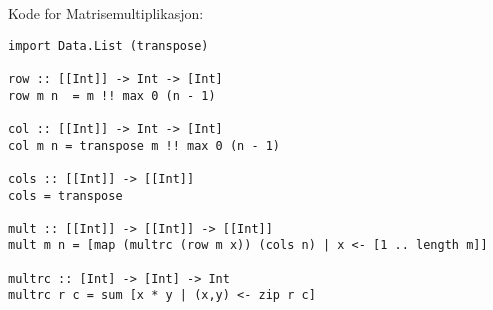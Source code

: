\documentclass{article}
\begin{document}
    \begin{ans}
        Kode for Matrisemultiplikasjon:
        \begin{lstlisting}
import Data.List (transpose)

row :: [[Int]] -> Int -> [Int]
row m n  = m !! max 0 (n - 1)

col :: [[Int]] -> Int -> [Int]
col m n = transpose m !! max 0 (n - 1)

cols :: [[Int]] -> [[Int]]
cols = transpose

mult :: [[Int]] -> [[Int]] -> [[Int]]
mult m n = [map (multrc (row m x)) (cols n) | x <- [1 .. length m]]

multrc :: [Int] -> [Int] -> Int
multrc r c = sum [x * y | (x,y) <- zip r c]
        \end{lstlisting}
    \end{ans}
\end{document}

